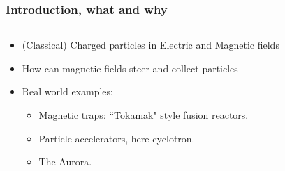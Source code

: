 \documentclass{beamer}
\begin{document}
\begin{frame}
\frametitle{Introduction, what and why}
\begin{columns}
\begin{column}{0.5\linewidth}
\begin{itemize}
\item<1-> (Classical) Charged particles in Electric and Magnetic fields
\item<2-> How can magnetic fields steer and collect particles
\item<3-> Real world examples:
\begin{itemize}
\item<3-> Magnetic traps: ``Tokamak" style fusion reactors.
\item<5-> Particle accelerators, here cyclotron.
\item<6-> The Aurora.
\end{itemize}
\end{itemize}
\end{column}
\begin{column}{0.5\linewidth}
%
\end{column}
\end{columns}
\end{frame}
\end{document}
